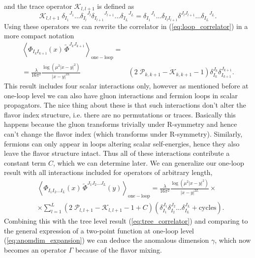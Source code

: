 and the trace operator $\mathcal{K}_{l,l+1}$ is defined as
\begin{equation}
	\mathcal{K}_{l,l+1} \; {\delta_{I_{1}}}^{J_{1}} \dots {\delta_{I_{l}}}^{J_{l}} {\delta_{I_{l+1}}}^{J_{l+1}} \dots {\delta_{I_{L}}}^{J_{L}} = {\delta_{I_{1}}}^{J_{1}} \dots {\delta_{I_l I_{l+1}}} {\delta}^{J_{l} J_{l+1}} \dots {\delta_{I_{L}}}^{J_{L}}.
\end{equation}
Using these operators we can rewrite the correlator in (\ref{eq:loop_correlator}) in a more compact notation
\begin{eqnarray}
	  \left< \Phi_{I_k I_{k+1}}(x) \, \tilde{\Phi}^{J_k J_{k+1}} \right>_{\mathrm{one-loop}} = &  \nonumber \\
	  = \frac{\lambda}{16\pi^2} \frac{\log (\mu^2|x-y|^2)}{|x-y|^{2L}} 
	 & \left( 2 \; \mathcal{P}_{k,k+1} - \mathcal{K}_{k,k+1} - 1 \right) \delta_{I_k}^{J_{k}} \delta_{I_{k+1}}^{J_{k+1}}.
\end{eqnarray}
This result includes four scalar interactions only, however as mentioned before at one-loop level we can also have gluon interactions and fermion loops in scalar propagators. 
The nice thing about these is that such interactions don't alter the flavor index structure, i.e. there are no permutations or traces. 
Basically this happens because the gluon transforms trivially under R-symmetry and hence can't change the flavor index (which transforms under R-symmetry). 
Similarly, fermions can only appear in loops altering scalar self-energies, hence they also leave the flavor structure intact.
Thus all of these interactions contribute a constant term $C$, which we can determine later. We can generalize our one-loop result with all interactions included for operators of arbitrary length,
\begin{equation}
\begin{split}
	 & \left< \Phi_{I_1 I_2 \dots I_L}(x) \, \tilde{\Phi}^{J_1 J_2 \dots J_L}(y)  \right>_{\mathrm{one-loop}}
	  = \frac{\lambda}{16\pi^2} \frac{\log (\mu^2|x-y|^2)}{|x-y|^{2L}} \times \nonumber \\
	 & \times \sum_{l=1}^L \left( 2 \; \mathcal{P}_{l,l+1} - \mathcal{K}_{l,l+1} - 1 + C\right)
	  \left( \delta_{I_1}^{J_1} \delta_{I_2}^{J_2} \dots \delta_{I_L}^{J_L} + \mathrm{cycles} \right).
\end{split}
\end{equation}
Combining this with the tree level result (\ref{eq:tree_correlator}) and comparing to the general expression of a two-point function at one-loop level (\ref{eq:anomdim_expansion}) we can deduce the anomalous dimension $\gamma$, which now becomes an operator $\Gamma$ because of the flavor mixing. 

